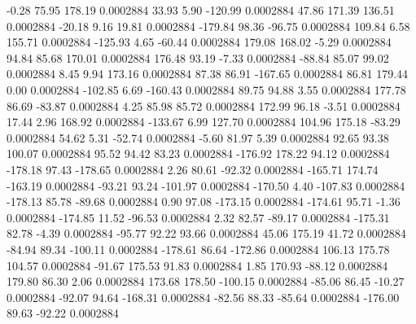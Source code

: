        -0.28       75.95      178.19     0.0002884
       33.93        5.90     -120.99     0.0002884
       47.86      171.39      136.51     0.0002884
      -20.18        9.16       19.81     0.0002884
     -179.84       98.36      -96.75     0.0002884
      109.84        6.58      155.71     0.0002884
     -125.93        4.65      -60.44     0.0002884
      179.08      168.02       -5.29     0.0002884
       94.84       85.68      170.01     0.0002884
      176.48       93.19       -7.33     0.0002884
      -88.84       85.07       99.02     0.0002884
        8.45        9.94      173.16     0.0002884
       87.38       86.91     -167.65     0.0002884
       86.81      179.44        0.00     0.0002884
     -102.85        6.69     -160.43     0.0002884
       89.75       94.88        3.55     0.0002884
      177.78       86.69      -83.87     0.0002884
        4.25       85.98       85.72     0.0002884
      172.99       96.18       -3.51     0.0002884
       17.44        2.96      168.92     0.0002884
     -133.67        6.99      127.70     0.0002884
      104.96      175.18      -83.29     0.0002884
       54.62        5.31      -52.74     0.0002884
       -5.60       81.97        5.39     0.0002884
       92.65       93.38      100.07     0.0002884
       95.52       94.42       83.23     0.0002884
     -176.92      178.22       94.12     0.0002884
     -178.18       97.43     -178.65     0.0002884
        2.26       80.61      -92.32     0.0002884
     -165.71      174.74     -163.19     0.0002884
      -93.21       93.24     -101.97     0.0002884
     -170.50        4.40     -107.83     0.0002884
     -178.13       85.78      -89.68     0.0002884
        0.90       97.08     -173.15     0.0002884
     -174.61       95.71       -1.36     0.0002884
     -174.85       11.52      -96.53     0.0002884
        2.32       82.57      -89.17     0.0002884
     -175.31       82.78       -4.39     0.0002884
      -95.77       92.22       93.66     0.0002884
       45.06      175.19       41.72     0.0002884
      -84.94       89.34     -100.11     0.0002884
     -178.61       86.64     -172.86     0.0002884
      106.13      175.78      104.57     0.0002884
      -91.67      175.53       91.83     0.0002884
        1.85      170.93      -88.12     0.0002884
      179.80       86.30        2.06     0.0002884
      173.68      178.50     -100.15     0.0002884
      -85.06       86.45      -10.27     0.0002884
      -92.07       94.64     -168.31     0.0002884
      -82.56       88.33      -85.64     0.0002884
     -176.00       89.63      -92.22     0.0002884
